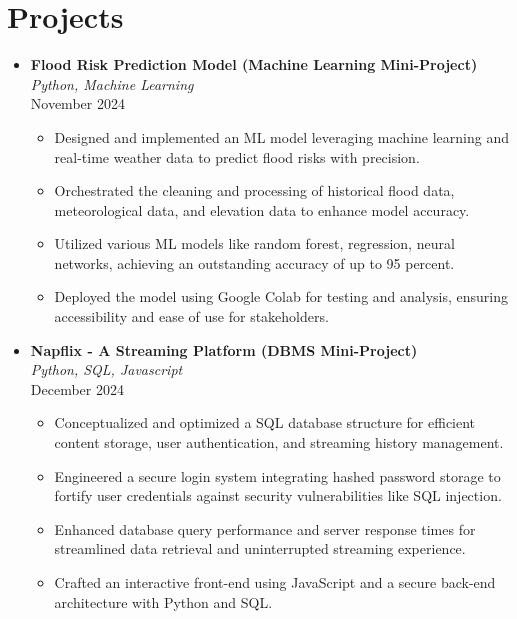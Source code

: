 \documentclass{article}
\begin{document}
\section*{Projects}
\begin{itemize}[leftmargin=*, topsep=0pt]
    \item \textbf{Flood Risk Prediction Model (Machine Learning Mini-Project)} \\
    \textit{Python, Machine Learning} \\
    November 2024
    \begin{itemize}[leftmargin=*, topsep=0pt]
        \item Designed and implemented an ML model leveraging machine learning and real-time weather data to predict flood risks with precision.
        \item Orchestrated the cleaning and processing of historical flood data, meteorological data, and elevation data to enhance model accuracy.
        \item Utilized various ML models like random forest, regression, neural networks, achieving an outstanding accuracy of up to 95 percent.
        \item Deployed the model using Google Colab for testing and analysis, ensuring accessibility and ease of use for stakeholders.
    \end{itemize}

    \item \textbf{Napflix - A Streaming Platform (DBMS Mini-Project)} \\
    \textit{Python, SQL, Javascript} \\
    December 2024
    \begin{itemize}[leftmargin=*, topsep=0pt]
        \item Conceptualized and optimized a SQL database structure for efficient content storage, user authentication, and streaming history management.
        \item Engineered a secure login system integrating hashed password storage to fortify user credentials against security vulnerabilities like SQL injection.
        \item Enhanced database query performance and server response times for streamlined data retrieval and uninterrupted streaming experience.
        \item Crafted an interactive front-end using JavaScript and a secure back-end architecture with Python and SQL.
    \end{itemize}


\end{itemize}
\end{document}
